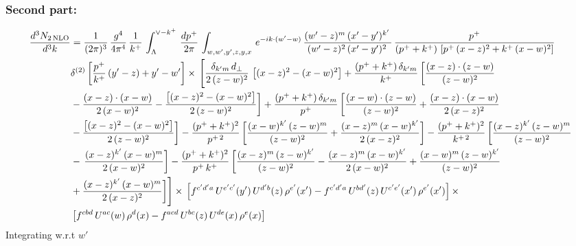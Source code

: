 \documentclass[9pt]{article}
\numberwithin{equation}{section}
\begin{document}
\subsubsection{Second part:\,}
\begin{align}
    \frac{d^{3}N_{2\,\rm NLO}}{d^{3}k} & =  \frac{1}{(2\pi)^{3}}\,\frac{g^{4}}{4\pi^{4}}\, \frac{1}{k^{+}}\,\int_{\Lambda}^{\vee-k^{+}}\, \frac{dp^{+}}{2\pi}\, \int_{w,w',y',z,y,x}\, e^{-ik\cdot (w'-w)}\, \frac{(w'-z)^{m}\,(x'-y')^{k'}\,}{(w'-z)^{2}\,(x'-y')^{2}\,}\, \frac{p^{+}}{(p^{+}+k^{+})\,\left[p^{+}\,(x-z)^{2}+k^{+}\,(x-w)^{2}\right]}\notag \\ & \delta^{(2)}\left[\frac{p^{+}}{k^{+}}\, (y'-z)+y'-w'\right]\times\, \Bigg[\frac{\delta_{k'm}\,d_{\perp}}{2\,(z-w)^{2}}\, \left[(x-z)^{2}-(x-w)^{2}\right]+\frac{(p^{+}+k^{+})\,\delta_{k'm}}{k^{+}}\,\bigg[\frac{(x-z)\cdot (z-w)}{(z-w)^{2}}\notag \\ & -\frac{(x-z)\cdot (x-w)}{2\,(x-w)^{2}}-\frac{\left[(x-z)^{2}-(x-w)^{2}\right]}{2\,(z-w)^{2}}\bigg]+\frac{(p^{+}+k^{+})\,\delta_{k'm}}{p^{+}}\,\bigg[\frac{(x-w)\cdot (z-w)}{(z-w)^{2}}+\frac{(x-z)\cdot (x-w)}{2\,(x-z)^{2}}\notag \\ & -\frac{\left[(x-z)^{2}-(x-w)^{2}\right]}{2\,(z-w)^{2}}\bigg]-\frac{(p^{+}+k^{+})^{2}}{p^{+\,2}}\,\bigg[\frac{(x-w)^{k'}\,(z-w)^{m}}{(z-w)^{2}}+\frac{(x-z)^{m}\,(x-w)^{k'}}{2\,(x-z)^{2}}\bigg]-\frac{(p^{+}+k^{+})^{2}}{k^{+\,2}}\,\bigg[\frac{(x-z)^{k'}\,(z-w)^{m}}{(z-w)^{2}}\notag \\ & -\,\frac{(x-z)^{k'}\,(x-w)^{m}}{2\,(x-w)^{2}}\bigg]-\frac{(p^{+}+k^{+})^{2}}{p^{+}\,k^{+}}\,\bigg[\frac{(x-z)^{m}\,(z-w)^{k'}}{(z-w)^{2}}-\frac{(x-z)^{m}\,(x-w)^{k'}}{2\,(x-w)^{2}}+\frac{(x-w)^{m}\,(z-w)^{k'}}{(z-w)^{2}}\notag \\ & +\frac{(x-z)^{k'}\,(x-w)^{m}}{2\,(x-z)^{2}}\bigg]\Bigg]\times\,\left[f^{c'd'a}\,U^{e'c'}(y')\,U^{d'b}(z)\,\rho^{e'}(x')-f^{c'd'a}\, 
    U^{bd'}(z)\,U^{c'e'}(x')\,\rho^{e'}(x')\right]\times \notag \\ & \left[f^{cbd}\,U^{ac}(w)\,\rho^{d}(x) -f^{acd}\,U^{bc}(z)\,U^{de}(x)\,\rho^{e}(x)\right]
\end{align}
Integrating w.r.t $w'$
\end{document}
